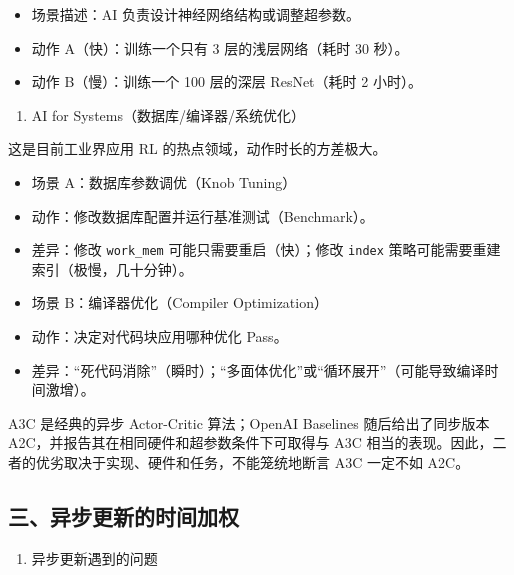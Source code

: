 \begin{itemize}
\tightlist
\item
  场景描述：AI 负责设计神经网络结构或调整超参数。
\item
  动作 A（快）：训练一个只有 3 层的浅层网络（耗时 30 秒）。
\item
  动作 B（慢）：训练一个 100 层的深层 ResNet（耗时 2 小时）。
\end{itemize}

\begin{enumerate}
\def\labelenumi{\arabic{enumi}.}
\setcounter{enumi}{1}
\tightlist
\item
  AI for Systems（数据库/编译器/系统优化）
\end{enumerate}

这是目前工业界应用 RL 的热点领域，动作时长的方差极大。

\begin{itemize}
\tightlist
\item
  场景 A：数据库参数调优（Knob Tuning）
\item
  动作：修改数据库配置并运行基准测试（Benchmark）。
\item
  差异：修改 \texttt{work\_mem} 可能只需要重启（快）；修改 \texttt{index} 策略可能需要重建索引（极慢，几十分钟）。
\item
  场景 B：编译器优化（Compiler Optimization）
\item
  动作：决定对代码块应用哪种优化 Pass。
\item
  差异：``死代码消除''（瞬时）；``多面体优化''或``循环展开''（可能导致编译时间激增）。
\end{itemize}

A3C 是经典的异步 Actor-Critic 算法；OpenAI Baselines 随后给出了同步版本 A2C，并报告其在相同硬件和超参数条件下可取得与 A3C 相当的表现。因此，二者的优劣取决于实现、硬件和任务，不能笼统地断言 A3C 一定不如 A2C。

\hypertarget{ux4e09ux5f02ux6b65ux66f4ux65b0ux7684ux65f6ux95f4ux52a0ux6743}{%
\subsection{三、异步更新的时间加权}\label{ux4e09ux5f02ux6b65ux66f4ux65b0ux7684ux65f6ux95f4ux52a0ux6743}}

\begin{enumerate}
\def\labelenumi{\arabic{enumi}.}
\tightlist
\item
  异步更新遇到的问题
\end{enumerate}

